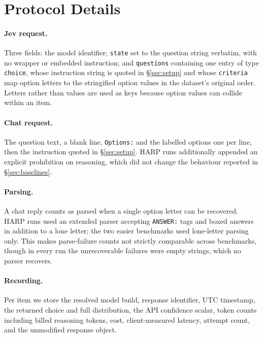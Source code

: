 \documentclass[11pt]{article}
\begin{document}


\appendix

\section{Protocol Details}
\label{app:protocol}

\paragraph{Jev request.} Three fields: the model identifier; \texttt{state} set to the question string verbatim, with no wrapper or embedded instruction; and \texttt{questions} containing one entry of type \texttt{choice}, whose instruction string is quoted in \S\ref{sec:setup} and whose \texttt{criteria} map option letters to the stringified option values in the dataset's original order. Letters rather than values are used as keys because option values can collide within an item.

\paragraph{Chat request.} The question text, a blank line, \texttt{Options:} and the labelled options one per line, then the instruction quoted in \S\ref{sec:setup}. HARP runs additionally appended an explicit prohibition on reasoning, which did not change the behaviour reported in \S\ref{sec:baselines}.

\paragraph{Parsing.} A chat reply counts as parsed when a single option letter can be recovered. HARP runs used an extended parser accepting \texttt{ANSWER:} tags and boxed answers in addition to a lone letter; the two easier benchmarks used lone-letter parsing only. This makes parse-failure counts not strictly comparable across benchmarks, though in every run the unrecoverable failures were empty strings, which no parser recovers.

\paragraph{Recording.} Per item we store the resolved model build, response identifier, UTC timestamp, the returned choice and full distribution, the API confidence scalar, token counts including billed reasoning tokens, cost, client-measured latency, attempt count, and the unmodified response object.
\end{document}
